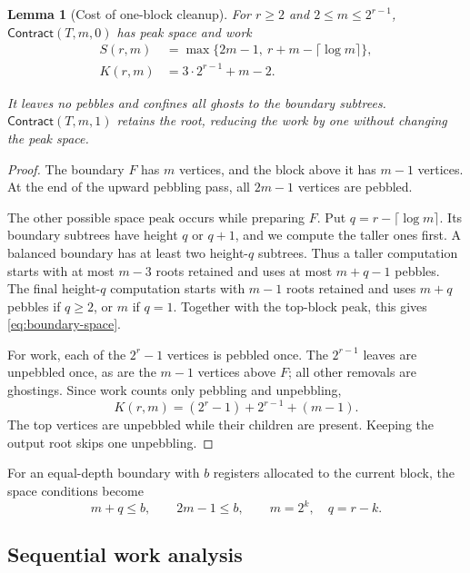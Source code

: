\documentclass[11pt]{article}
\newtheorem{lemma}[lemma]{Lemma}
\theoremstyle{definition}
\theoremstyle{remark}
\newcommand{\Contract}{\mathsf{Contract}}
\begin{document}
\begin{lemma}[Cost of one-block cleanup]
\label{lem:contract}
For $r\ge2$ and $2\le m\le2^{r-1}$, $\Contract(T,m,0)$ has peak space and work
\begin{align}
 S(r,m)&=\max\{2m-1,\ r+m-\lceil\log m\rceil\}, \label{eq:boundary-space}\\
 K(r,m)&=3\cdot2^{r-1}+m-2. \label{eq:block-work}
\end{align}

It leaves no pebbles and confines all ghosts to the boundary subtrees. $\Contract(T,m,1)$ retains the root, reducing the work by one without changing the peak space.
\end{lemma}

\begin{proof}
The boundary $F$ has $m$ vertices, and the block above it has $m-1$ vertices. At the end of the upward pebbling pass, all $2m-1$ vertices are pebbled.

The other possible space peak occurs while preparing $F$. Put $q=r-\lceil\log m\rceil$. Its boundary subtrees have height $q$ or $q+1$, and we compute the taller ones first. A balanced boundary has at least two height-$q$ subtrees. Thus a taller computation starts with at most $m-3$ roots retained and uses at most $m+q-1$ pebbles. The final height-$q$ computation starts with $m-1$ roots retained and uses $m+q$ pebbles if $q\ge2$, or $m$ if $q=1$. Together with the top-block peak, this gives \cref{eq:boundary-space}.

For work, each of the $2^r-1$ vertices is pebbled once. The $2^{r-1}$ leaves are unpebbled once, as are the $m-1$ vertices above $F$; all other removals are ghostings. Since work counts only pebbling and unpebbling,
\[
 K(r,m)=(2^r-1)+2^{r-1}+(m-1).
\]
The top vertices are unpebbled while their children are present. Keeping the output root skips one unpebbling.
\end{proof}

For an equal-depth boundary with $b$ registers allocated to the current block, the space conditions become
\begin{equation}
 m+q\le b,\qquad 2m-1\le b,\qquad m=2^k,\quad q=r-k.
 \label{eq:feasible-cut}
\end{equation}

\subsection{Sequential work analysis}
\label{sec:sequential}
\end{document}
